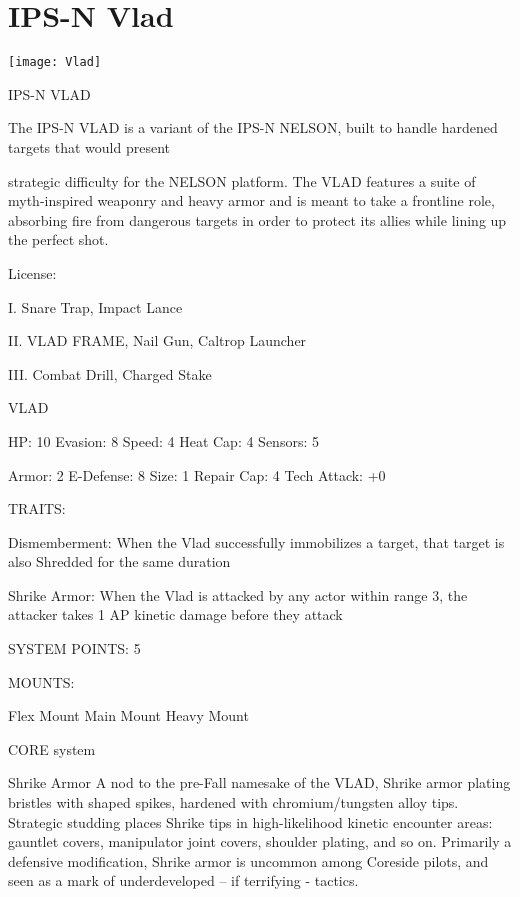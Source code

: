 \section{IPS-N Vlad}

\texttt{[image: Vlad]}

                                                     IPS-N VLAD

The IPS-N VLAD is a variant of the IPS-N NELSON, built to handle hardened targets that would present

strategic difficulty for the NELSON platform. The VLAD features a suite of myth-inspired weaponry and
heavy armor and is meant to take a frontline role, absorbing fire from dangerous targets in order to protect
its allies while lining up the perfect shot.




                                                      License:

I. Snare Trap, Impact Lance

II. VLAD FRAME, Nail Gun, Caltrop Launcher

III. Combat Drill, Charged Stake


                                                       VLAD

  HP: 10          Evasion: 8                              Speed: 4            Heat Cap: 4         Sensors: 5

  Armor: 2        E-Defense: 8                            Size: 1             Repair Cap: 4       Tech Attack:
                                                                                                  +0

                                                      TRAITS:

  Dismemberment: When the Vlad successfully immobilizes a target, that target is also Shredded for the
  same duration

  Shrike Armor: When the Vlad is attacked by any actor within range 3, the attacker takes 1 AP kinetic
  damage before they attack

                                                SYSTEM POINTS: 5

                                                      MOUNTS:

  Flex Mount                          Main Mount                               Heavy Mount

                                                   CORE system

                                                    Shrike Armor
  A nod to the pre-Fall namesake of the VLAD, Shrike armor plating bristles with shaped spikes, hardened
  with chromium/tungsten alloy tips. Strategic studding places Shrike tips in high-likelihood kinetic
  encounter areas: gauntlet covers, manipulator joint covers, shoulder plating, and so on. Primarily a
  defensive modification, Shrike armor is uncommon among Coreside pilots, and seen as a mark of
  underdeveloped -- if terrifying - tactics.

